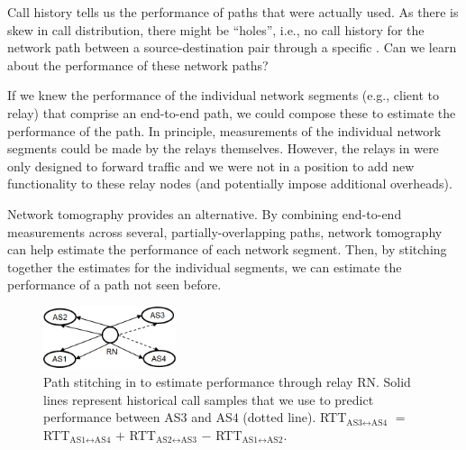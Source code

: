 Call history tells us the performance of paths that were actually used. 
As there is skew in call distribution, there might be ``holes'', i.e., no call history for the network path between a source-destination pair through a specific \option. 
Can we learn about the performance of these network paths? 


If we knew the performance of the individual network segments (e.g., client to relay) that comprise an end-to-end path, we could compose these to estimate the performance of the path. In principle, measurements of the individual network segments could be made by the relays themselves. However, the relays in \skype were only designed to forward traffic and we were not in a position to add new functionality to these relay nodes (and potentially impose additional overheads). 

 
Network tomography provides an alternative. By combining end-to-end measurements across several, partially-overlapping paths, network tomography can help estimate the performance of each network segment. Then, by stitching together the estimates for the individual segments, we can estimate the performance of a path not seen before.


\begin{figure}[t!]
\centering
\includegraphics[width=0.35\textwidth]{figures/Via-Tomography.png}
\caption{Path stitching in \hybrid to estimate performance through relay RN. Solid lines represent historical call samples that we use to predict performance between AS$3$ and AS$4$ (dotted line). RTT$_{\text{AS3}\leftrightarrow\text{AS4}}$ $=$ RTT$_{\text{AS1}\leftrightarrow\text{AS4}}$ $+$ RTT$_{\text{AS2}\leftrightarrow\text{AS3}}$ $-$ RTT$_{\text{AS1}\leftrightarrow\text{AS2}}$.}
\label{fig:tomography}
\end{figure}


